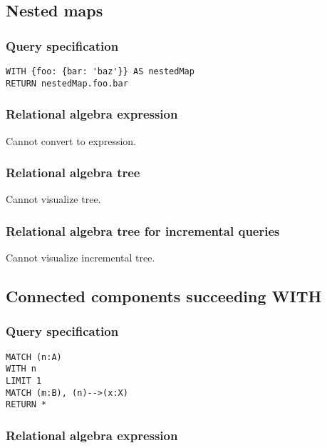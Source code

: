 \subsection{Nested maps}

\subsubsection*{Query specification}

\begin{lstlisting}
WITH {foo: {bar: 'baz'}} AS nestedMap
RETURN nestedMap.foo.bar
\end{lstlisting}

\subsubsection*{Relational algebra expression}

Cannot convert to expression.

\subsubsection*{Relational algebra tree}

Cannot visualize tree.

\subsubsection*{Relational algebra tree for incremental queries}

Cannot visualize incremental tree.

\subsection{Connected components succeeding WITH}

\subsubsection*{Query specification}

\begin{lstlisting}
MATCH (n:A)
WITH n
LIMIT 1
MATCH (m:B), (n)-->(x:X)
RETURN *
\end{lstlisting}

\subsubsection*{Relational algebra expression}

